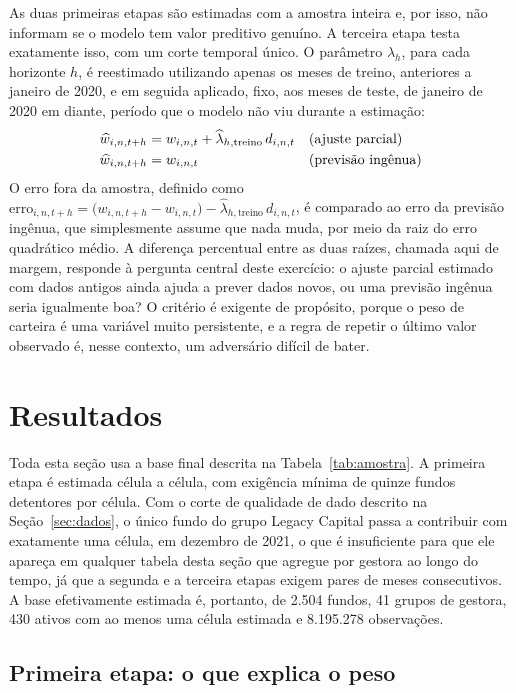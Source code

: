 \documentclass[12pt,a4paper]{article}
\begin{document}
As duas primeiras etapas são estimadas com a amostra inteira e, por isso, não informam se o
modelo tem valor preditivo genuíno. A terceira etapa testa exatamente isso, com um corte
temporal único. O parâmetro $\lambda_h$, para cada horizonte $h$, é reestimado utilizando
apenas os meses de treino, anteriores a janeiro de 2020, e em seguida aplicado, fixo, aos
meses de teste, de janeiro de 2020 em diante, período que o modelo não viu durante a
estimação:
\begin{align}
\widehat w_{i,n,t+h} &= w_{i,n,t} + \widehat\lambda_{h,\text{treino}}\, d_{i,n,t}
&&\text{(ajuste parcial)} \notag\\
\widehat w_{i,n,t+h} &= w_{i,n,t} &&\text{(previsão ingênua)}
\label{eq:oos}
\end{align}
O erro fora da amostra, definido como $\text{erro}_{i,n,t+h} = \big(w_{i,n,t+h}-w_{i,n,t}\big)
- \widehat\lambda_{h,\text{treino}}\, d_{i,n,t}$, é comparado ao erro da previsão ingênua,
que simplesmente assume que nada muda, por meio da raiz do erro quadrático médio. A diferença
percentual entre as duas raízes, chamada aqui de margem, responde à pergunta central deste
exercício: o ajuste parcial estimado com dados antigos ainda ajuda a prever dados novos, ou
uma previsão ingênua seria igualmente boa? O critério é exigente de propósito, porque o peso
de carteira é uma variável muito persistente, e a regra de repetir o último valor observado
é, nesse contexto, um adversário difícil de bater.

\clearpage
\section{Resultados}
\label{sec:resultados}

Toda esta seção usa a base final descrita na Tabela~\ref{tab:amostra}. A primeira etapa é
estimada célula a célula, com exigência mínima de quinze fundos detentores por célula. Com o
corte de qualidade de dado descrito na Seção~\ref{sec:dados}, o único fundo do grupo Legacy
Capital passa a contribuir com exatamente uma célula, em dezembro de 2021, o que é
insuficiente para que ele apareça em qualquer tabela desta seção que agregue por gestora ao
longo do tempo, já que a segunda e a terceira etapas exigem pares de meses consecutivos. A
base efetivamente estimada é, portanto, de 2.504 fundos, 41 grupos de gestora, 430 ativos com
ao menos uma célula estimada e 8.195.278 observações.

\subsection{Primeira etapa: o que explica o peso}
\end{document}
